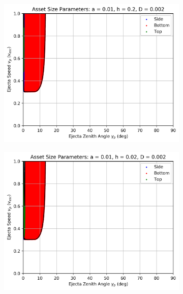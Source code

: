 \documentclass{article}
\begin{document}
\begin{figure}
	\begin{subfigure}[t]{.32\textwidth}
		\centering
		\includegraphics[width=.98\linewidth]{asset_speed_zenith_plot_1.100e+00_1.000e-02_2.000e-01_2.000e-03.png}  
		\label{fig:sub-asset_speed_zenith_h2_1}
	\end{subfigure}
	\begin{subfigure}[t]{.32\textwidth}
		\centering
		\includegraphics[width=.98\linewidth]{asset_speed_zenith_plot_1.100e+00_1.000e-02_2.000e-02_2.000e-03.png}  
		\label{fig:sub-asset_speed_zenith_h2_2}

\end{subfigure}
\end{figure}
\end{document}
